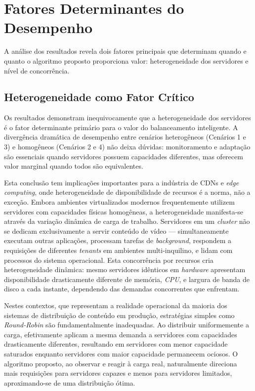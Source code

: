 \section{Fatores Determinantes do Desempenho}

A análise dos resultados revela dois fatores principais que determinam quando e quanto o algoritmo proposto proporciona valor: heterogeneidade dos servidores e nível de concorrência.

\subsection{Heterogeneidade como Fator Crítico}

Os resultados demonstram inequivocamente que a heterogeneidade dos servidores é o fator determinante primário para o valor do balanceamento inteligente. A divergência dramática de desempenho entre cenários heterogêneos (Cenários 1 e 3) e homogêneos (Cenários 2 e 4) não deixa dúvidas: monitoramento e adaptação são essenciais quando servidores possuem capacidades diferentes, mas oferecem valor marginal quando todos são equivalentes.

Esta conclusão tem implicações importantes para a indústria de CDNs e \textit{edge computing}, onde heterogeneidade de disponibilidade de recursos é a norma, não a exceção. Embora ambientes virtualizados modernos frequentemente utilizem servidores com capacidades físicas homogêneas, a heterogeneidade manifesta-se através da variação dinâmica de carga de trabalho. Servidores em um \textit{cluster} não se dedicam exclusivamente a servir conteúdo de vídeo — simultaneamente executam outras aplicações, processam tarefas de \textit{background}, respondem a requisições de diferentes \textit{tenants} em ambientes multi-inquilino, e lidam com processos do sistema operacional. Esta concorrência por recursos cria heterogeneidade dinâmica: mesmo servidores idênticos em \textit{hardware} apresentam disponibilidade drasticamente diferente de memória, \textit{CPU}, e largura de banda de disco a cada instante, dependendo das demandas concorrentes que enfrentam.

Nestes contextos, que representam a realidade operacional da maioria dos sistemas de distribuição de conteúdo em produção, estratégias simples como \textit{Round-Robin} são fundamentalmente inadequadas. Ao distribuir uniformemente a carga, efetivamente aplicam a mesma demanda a servidores com capacidades drasticamente diferentes, resultando em servidores com menor capacidade saturados enquanto servidores com maior capacidade permanecem ociosos. O algoritmo proposto, ao observar e reagir à carga real, naturalmente direciona mais requisições para servidores capazes e menos para servidores limitados, aproximando-se de uma distribuição ótima.

